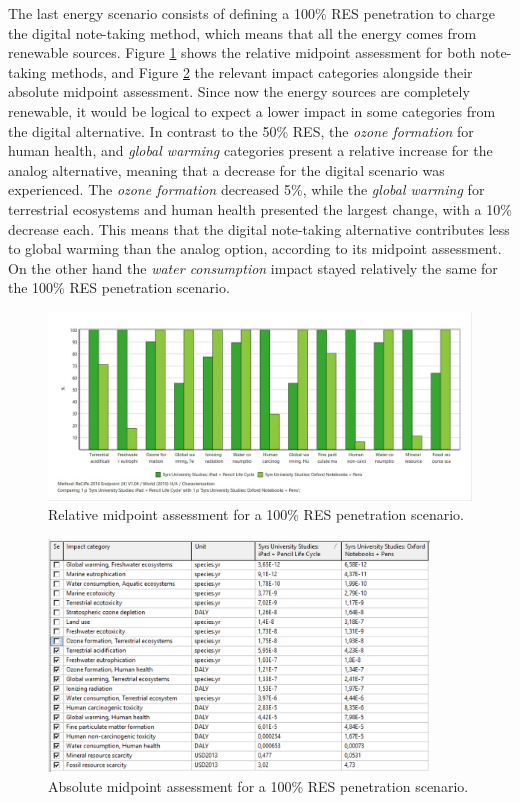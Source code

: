 The last energy scenario consists of defining a 100\% RES penetration to charge the digital note-taking method, which means that all the energy comes from renewable sources. Figure \ref{fig:characterization_RES_100} shows the relative midpoint assessment for both note-taking methods, and Figure \ref{fig:characterization_table_RES_100} the relevant impact categories alongside their absolute midpoint assessment. Since now the energy sources are completely renewable, it would be logical to expect a lower impact in some categories from the digital alternative. In contrast to the 50\% RES, the \textit{ozone formation} for human health, and \textit{global warming} categories present a relative increase for the analog alternative, meaning that a decrease for the digital scenario was experienced. The \textit{ozone formation} decreased 5\%, while the \textit{global warming} for terrestrial ecosystems and human health presented the largest change, with a 10\% decrease each. This means that the digital note-taking alternative contributes less to global warming than the analog option, according to its midpoint assessment. On the other hand the \textit{water consumption} impact stayed relatively the same for the 100\% RES penetration scenario.

\begin{figure}[H]
    \centering
    \includegraphics[width=\textwidth]{images/RES_100/Characterization_RES_100.JPG}
    \caption{Relative midpoint assessment for a 100\% RES penetration scenario.}\label{fig:characterization_RES_100}
\end{figure}

\begin{figure}[H]
    \centering
    \includegraphics[width=0.9\textwidth]{images/RES_100/Characterization_Table_RES_100.PNG}
    \caption{Absolute midpoint assessment for a 100\% RES penetration scenario.}\label{fig:characterization_table_RES_100}
\end{figure}

